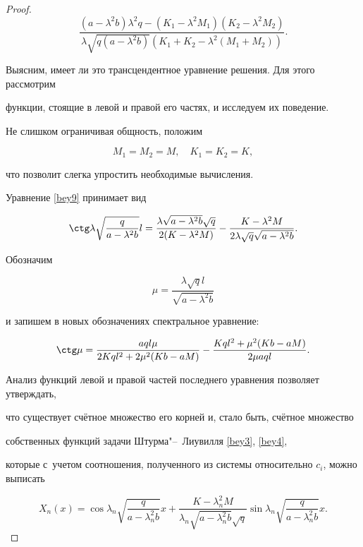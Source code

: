 \begin{proof}
\begin{equation}
\frac{(a-\lambda^2b)\lambda^2q-

(K_1-\lambda^2M_1)(K_2-\lambda^2M_2)}

{\lambda \sqrt{q(a-\lambda^2b)}(K_1+K_2-\lambda^2(M_1+M_2))}.

\end{equation}

Выясним, имеет ли это трансцендентное уравнение решения. Для этого рассмотрим

функции, стоящие в левой и правой его частях, и исследуем их поведение.

Не слишком ограничивая общность, положим 

$$M_1=M_2=M,\quad  K_1=K_2=K,$$ 

что позволит слегка упростить необходимые вычисления. 

Уравнение \eqref{bey9} принимает вид

$$\ctg \lambda \sqrt{\frac{q}{a-\lambda^2b}}l=\frac{\lambda\sqrt{a-\lambda^2b}\sqrt{q}}{2(K-\lambda^2M)}-

\frac{K-\lambda^2M}{2\lambda \sqrt{q}\sqrt{a-\lambda^2b}}.$$

 Обозначим

$$\mu=\frac{\lambda \sqrt{q}l}{\sqrt{a-\lambda^2b}}$$

и запишем в новых обозначениях спектральное уравнение:

\begin{equation}

\label{bey10}

\ctg \mu=

\frac{aql\mu}{2Kql^2+2\mu^2(Kb-aM)}-\frac{Kql^2+\mu^2(Kb-aM)}{2\mu aql}.

\end{equation}

Анализ функций левой и правой частей последнего уравнения позволяет утверждать,

что существует счётное множество его корней и, стало быть, счётное множество

собственных функций задачи Штурма"--~Лиувилля  \eqref{bey3}, \eqref{bey4}, 

которые с~учетом соотношения, полученного из системы относительно $c_i$, можно выписать

 \begin{equation}

\label{bey11}

X_n(x)=\cos \lambda_n \sqrt{\frac{q}{a-\lambda_n^2b}}x+\frac{K-\lambda_n^2M}{\lambda_n

\sqrt{a-\lambda^2_nb}\sqrt{q}}\sin \lambda_n \sqrt{\frac{q}{a-\lambda_n^2b}}x.


\end{equation}
\end{proof}
